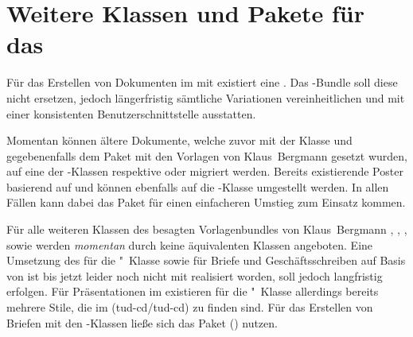 \section{Weitere Klassen und Pakete für das \CD}
Für das Erstellen von Dokumenten im \TUDCD mit  existiert eine 
. Das 
\TUDScript-Bundle soll diese nicht ersetzen, jedoch längerfristig sämtliche 
Variationen vereinheitlichen und mit einer konsistenten Benutzerschnittstelle 
ausstatten. 

Momentan können ältere Dokumente, welche zuvor mit der Klasse 
 und gegebenenfalls dem Paket 
 mit den Vorlagen von Klaus~Bergmann 
gesetzt wurden, auf eine der \TUDScript-Klassen  respektive 
 oder  migriert werden. Bereits 
existierende Poster basierend auf  und 
 können ebenfalls auf die 
\TUDScript-Klasse  umgestellt werden. In allen Fällen kann 
dabei das Paket  für einen einfacheren Umstieg zum Einsatz 
kommen. 

Für alle weiteren Klassen des besagten Vorlagenbundles von Klaus~Bergmann
, ,
,  sowie
 werden \emph{momentan} durch \TUDScript
keine äquivalenten Klassen angeboten.
%
Eine Umsetzung des \CDs für die "~Klasse sowie für Briefe und 
Geschäftsschreiben auf Basis von \KOMAScript{} ist bis jetzt leider noch nicht 
mit \TUDScript realisiert worden, soll jedoch langfristig erfolgen. Für 
Präsentationen im \TUDCD existieren für die "~Klasse allerdings 
bereits mehrere Stile, die im \GitHubRepo(tud-cd/tud-cd) zu finden sind. 
Für das Erstellen von Briefen mit den \TUDScript-Klassen ließe sich das Paket 
() nutzen.



